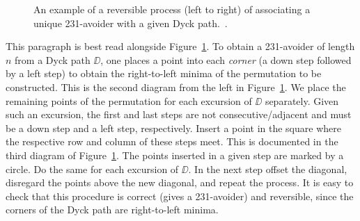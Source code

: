 \begin{figure}[!ht]
\begin{center}
\caption{\small{An example of a reversible process (left to right) of associating a unique 231-avoider with a given Dyck path.~\cite{albert-new}.}}
\label{fig:bij231dyck}
\end{center}
\end{figure}

This paragraph is best read alongside Figure~\ref{fig:bij231dyck}. To obtain a 231-avoider of length $n$ from a Dyck path $\DD$, one places a point into each \emph{corner} (a down step followed by a left step) to obtain the right-to-left minima of the permutation to be constructed. This is the second diagram from the left in Figure~\ref{fig:bij231dyck}.  We place the remaining points of the permutation for each excursion of $\DD$ separately. Given such an excursion, the first and last steps are not consecutive/adjacent and must be a down step and a left step, respectively. Insert a point in the square where the respective row and column of these steps meet. This is documented in the third diagram of Figure~\ref{fig:bij231dyck}. The points inserted in a given step are marked by a circle. Do the same for each excursion of $\DD$. In the next step offset the diagonal, disregard the points above the new diagonal, and repeat the process. It is easy to check that this procedure is correct (gives a 231-avoider) and reversible, since the corners of the Dyck path are right-to-left minima.

